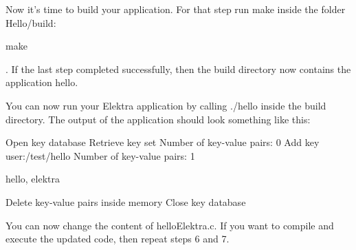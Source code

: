 \begin{DoxyEnumerate}
\item Now it’s time to build your application. For that step run {\ttfamily make} inside the folder {\ttfamily Hello/build}\+:
\end{DoxyEnumerate}


\begin{DoxyCode}
make
\end{DoxyCode}


. If the last step completed successfully, then the build directory now contains the application {\ttfamily hello}.


\begin{DoxyEnumerate}
\item You can now run your Elektra application by calling {\ttfamily ./hello} inside the build directory. The output of the application should look something like this\+:
\end{DoxyEnumerate}


\begin{DoxyCode}
Open key database
Retrieve key set
Number of key-value pairs: 0
Add key user:/test/hello
Number of key-value pairs: 1

hello, elektra

Delete key-value pairs inside memory
Close key database
\end{DoxyCode}



\begin{DoxyEnumerate}
\item You can now change the content of {\ttfamily hello\+Elektra.\+c}. If you want to compile and execute the updated code, then repeat steps 6 and 7. 
\end{DoxyEnumerate}